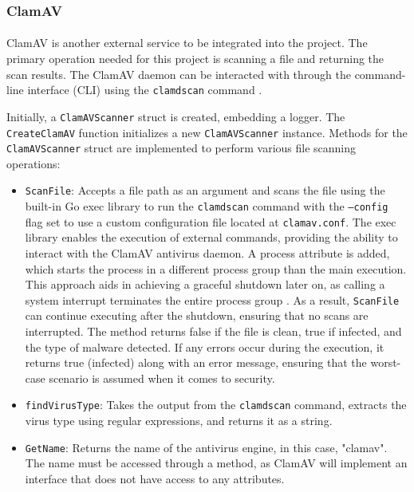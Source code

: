 \documentclass[12pt, conference, final, a4paper, onecolumn, compsoc]{IEEEtran}
\begin{document}
\subsubsection*{ClamAV}
\paragraph{}

ClamAV is another external service to be integrated into the project. The
primary operation needed for this project is scanning a file and returning the
scan results. The ClamAV daemon can be interacted with through the command-line
interface (CLI) using the \texttt{clamdscan} command \citep{clamav-repo}.

Initially, a \texttt{ClamAVScanner} struct is created, embedding a logger. The
\texttt{CreateClamAV} function initializes a new \texttt{ClamAVScanner}
instance. Methods for the \texttt{ClamAVScanner} struct are implemented to
perform various file scanning operations:

\begin{itemize}
  \item \texttt{ScanFile}: Accepts a file path as an argument and scans the file
        using the built-in Go exec library to run the \texttt{clamdscan} command
        with the \texttt{--config} flag set to use a custom configuration file
        located at \texttt{clamav.conf}. The exec library enables the execution
        of external commands, providing the ability to interact with the ClamAV
        antivirus daemon. A process attribute is added, which starts the process
        in a different process group than the main execution. This approach aids
        in achieving a graceful shutdown later on, as calling a system interrupt
        terminates the entire process group \citep{process-groups}. As a result,
        \texttt{ScanFile} can continue executing after the shutdown, ensuring
        that no scans are interrupted. The method returns false if the file is
        clean, true if infected, and the type of malware detected. If any errors
        occur during the execution, it returns true (infected) along with an
        error message, ensuring that the worst-case scenario is assumed when it
        comes to security.
  \item \texttt{findVirusType}: Takes the output from the \texttt{clamdscan}
        command, extracts the virus type using regular expressions, and returns
        it as a string.
  \item \texttt{GetName}: Returns the name of the antivirus engine, in this
        case, "clamav". The name must be accessed through a method, as ClamAV
        will implement an interface that does not have access to any attributes.
\end{itemize}
\end{document}
